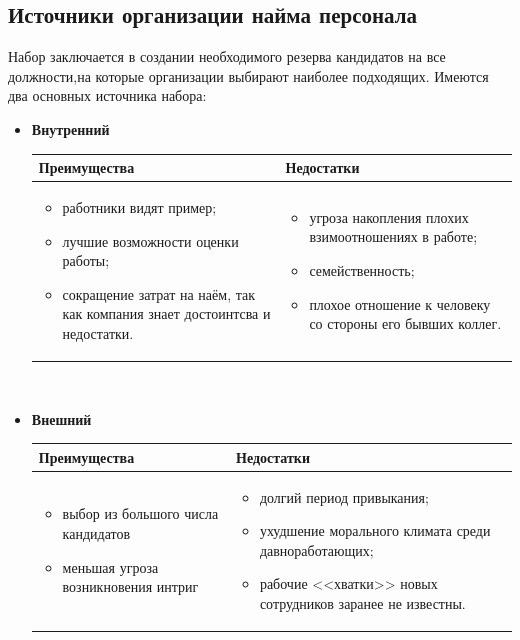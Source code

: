 \documentclass[a4paper,12pt,oneside,final]{extarticle}
\numberwithin{equation}{section}
\begin{document}
\subsection{Источники организации найма персонала}
Набор заключается в создании необходимого резерва кандидатов на все должности,на которые организации выбирают наиболее подходящих. 
Имеются два основных источника набора:
\begin{itemize}
	\item \textbf{Внутренний} \\[0.5em]
	\begin{tabularx}{\linewidth}{|X|X|}
		\hline
		Преимущества & Недостатки \\ \hline
		\begin{itemize}[leftmargin=*, topsep=0pt]
			\item работники видят пример;
			\item лучшие возможности оценки работы;
			\item сокращение затрат на наём, так как компания знает достоинтсва и недостатки.
		\end{itemize}
		& 
		\begin{itemize}[leftmargin=*, topsep=0pt]
			\item угроза накопления плохих взимоотношениях в работе;
			\item семейственность;
			\item плохое отношение к человеку со стороны его бывших коллег.
		\end{itemize} \\ \hline
	\end{tabularx} \\[0.5em]
	\item \textbf{Внешний} \\[0.5em]
	\begin{tabularx}{\linewidth}{|X|X|}
		\hline
		Преимущества & Недостатки \\ \hline
		\begin{itemize}[leftmargin=*]
			\item выбор из большого числа кандидатов
			\item меньшая угроза возникновения интриг
		\end{itemize}
		& 
		\begin{itemize}[leftmargin=*]
			\item долгий период привыкания;
			\item ухудшение морального климата среди давноработающих;
			\item рабочие <<хватки>> новых сотрудников заранее не известны.
		\end{itemize} \\ \hline
	\end{tabularx} \\[0.5em]
\end{itemize}
\end{document}
